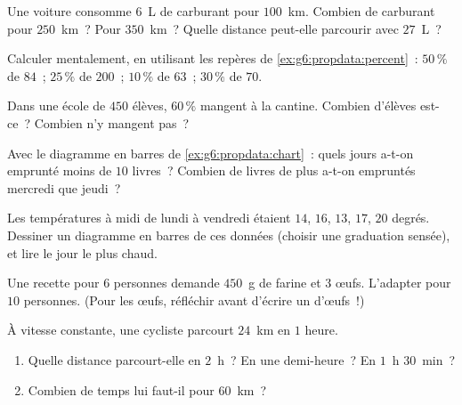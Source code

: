 \begin{exercise}[$\star$]\label{exo:g6:propdata:4}
Une voiture consomme $6$~L de carburant pour $100$~km. Combien de
carburant pour $250$~km~? Pour $350$~km~? Quelle distance peut-elle
parcourir avec $27$~L~?
\end{exercise}

\begin{exercise}[$\star$]\label{exo:g6:propdata:5}
Calculer mentalement, en utilisant les repères de
\cref{ex:g6:propdata:percent}~:
$50\,\%$ de $84$~; \quad $25\,\%$ de $200$~; \quad $10\,\%$ de $63$~;
\quad $30\,\%$ de $70$.
\end{exercise}

\begin{exercise}[$\star$]\label{exo:g6:propdata:6}
Dans une école de $450$ élèves, $60\,\%$ mangent à la cantine.
Combien d'élèves est-ce~? Combien n'y mangent pas~?
\end{exercise}

\begin{exercise}[$\star$]\label{exo:g6:propdata:7}
Avec le diagramme en barres de \cref{ex:g6:propdata:chart}~: quels
jours a-t-on emprunté moins de $10$ livres~? Combien de livres de
plus a-t-on empruntés mercredi que jeudi~?
\end{exercise}

\begin{exercise}[$\star$]\label{exo:g6:propdata:8}
Les températures à midi de lundi à vendredi étaient $14$, $16$, $13$,
$17$, $20$ degrés. Dessiner un diagramme en barres de ces données
(choisir une graduation sensée), et lire le jour le plus chaud.
\end{exercise}

\begin{exercise}[$\star\star$]\label{exo:g6:propdata:9}
Une recette pour $6$ personnes demande $450$~g de farine et $3$
œufs. L'adapter pour $10$ personnes. (Pour les œufs, réfléchir avant
d'écrire un  d'œufs~!)
\end{exercise}

\begin{exercise}[$\star\star$]\label{exo:g6:propdata:10}
À vitesse constante, une cycliste parcourt $24$~km en $1$ heure.
\begin{enumerate}
  \item Quelle distance parcourt-elle en $2$~h~? En une demi-heure~?
        En $1$~h $30$~min~?
  \item Combien de temps lui faut-il pour $60$~km~?
\end{enumerate}
\end{exercise}

